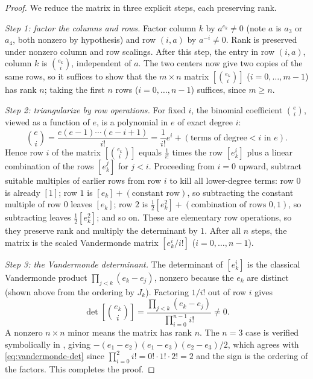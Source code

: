 \documentclass[a4paper,11pt]{article}
\newcommand{\filename}[1]{\texttt{\seqsplit{#1}}}
\theoremstyle{plain}
\theoremstyle{definition}
\theoremstyle{remark}
\begin{document}
\begin{proof}
We reduce the matrix in three explicit steps, each preserving rank.

\emph{Step 1: factor the columns and rows.} Factor column $k$ by $a^{e_k} \neq 0$ (note $a$
is $a_3$ or $a_4$, both nonzero by hypothesis) and row $(i, a)$ by $a^{-i} \neq 0$. Rank is
preserved under nonzero column and row scalings. After this step, the entry in row
$(i, a)$, column $k$ is $\binom{e_k}{i}$, independent of $a$. The two centers now give two
copies of the same rows, so it suffices to show that the $m \times n$ matrix
$[\binom{e_k}{i}]$ ($i = 0, \dots, m-1$) has rank $n$; taking the first $n$ rows
($i = 0, \dots, n-1$) suffices, since $m \geq n$.

\emph{Step 2: triangularize by row operations.} For fixed $i$, the binomial coefficient
$\binom{e}{i}$, viewed as a function of $e$, is a polynomial in $e$ of exact degree $i$:
\[
\binom{e}{i} = \frac{e (e-1) \cdots (e - i + 1)}{i!}
= \frac{1}{i!} e^i + (\text{terms of degree} < i \text{ in } e).
\]
Hence row $i$ of the matrix $[\binom{e_k}{i}]$ equals $\frac{1}{i!}$ times the row
$[e_k^i]$ plus a linear combination of the rows $[e_k^j]$ for $j < i$. Proceeding from
$i = 0$ upward, subtract suitable multiples of earlier rows from row $i$ to kill all
lower-degree terms: row $0$ is already $[1]$; row $1$ is $[e_k] + (\text{constant row})$,
so subtracting the constant multiple of row $0$ leaves $[e_k]$; row $2$ is
$\frac{1}{2}[e_k^2] + (\text{combination of rows } 0, 1)$, so subtracting leaves
$\frac{1}{2}[e_k^2]$; and so on. These are elementary row operations, so they preserve rank
and multiply the determinant by $1$. After all $n$ steps, the matrix is the scaled
Vandermonde matrix $[e_k^i / i!]$ ($i = 0, \dots, n-1$).

\emph{Step 3: the Vandermonde determinant.} The determinant of $[e_k^i]$ is the classical
Vandermonde product $\prod_{j < k} (e_k - e_j)$, nonzero because the $e_k$ are distinct
(shown above from the ordering by $J_k$). Factoring $1/i!$ out of row $i$ gives
\begin{equation}\label{eq:vandermonde-det}
\det[\binom{e_k}{i}] = \frac{\prod_{j<k}(e_k - e_j)}{\prod_{i=0}^{n-1} i!} \neq 0.
\end{equation}
A nonzero $n \times n$ minor means the matrix has rank $n$. The $n = 3$ case is verified
symbolically in \filename{m1\_block\_rank.py}, giving
$-(e_1-e_2)(e_1-e_3)(e_2-e_3)/2$, which agrees with \eqref{eq:vandermonde-det} since
$\prod_{i=0}^{2} i! = 0! \cdot 1! \cdot 2! = 2$ and the sign is the ordering of the factors.
This completes the proof.
\end{proof}
\end{document}
